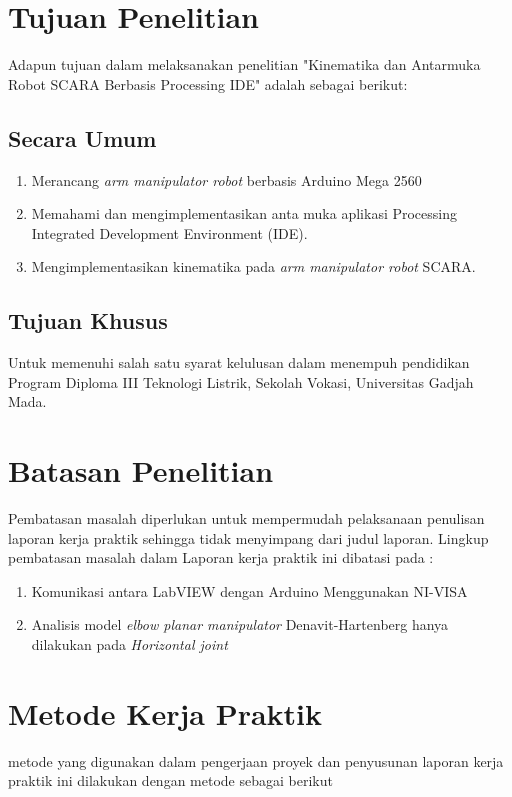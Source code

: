 \section{Tujuan Penelitian}
Adapun tujuan dalam melaksanakan penelitian "Kinematika dan Antarmuka Robot SCARA Berbasis Processing IDE" adalah sebagai berikut:

	\subsection{Secara Umum}
		\begin{enumerate}
		\item Merancang \emph{ arm manipulator robot} berbasis Arduino Mega 2560
		\item Memahami dan mengimplementasikan anta muka aplikasi Processing Integrated Development Environment (IDE).
		\item Mengimplementasikan kinematika pada \emph{arm manipulator robot} SCARA.
	\end{enumerate}
	\subsection{Tujuan Khusus}
	 Untuk memenuhi salah satu syarat kelulusan dalam menempuh pendidikan Program   Diploma III Teknologi Listrik, Sekolah Vokasi, Universitas Gadjah Mada. 
	
	
\section{Batasan Penelitian}
	Pembatasan masalah diperlukan untuk mempermudah pelaksanaan penulisan laporan kerja praktik sehingga tidak menyimpang dari judul laporan. Lingkup pembatasan masalah dalam Laporan kerja praktik ini dibatasi pada :
	
	\begin{enumerate}
		
		\item Komunikasi antara LabVIEW dengan Arduino Menggunakan NI-VISA
		\item Analisis model \textit{elbow planar manipulator} Denavit-Hartenberg hanya dilakukan pada \textit{Horizontal joint}
		
	\end{enumerate}

\section{Metode Kerja Praktik}
metode yang digunakan dalam pengerjaan proyek dan penyusunan laporan kerja praktik ini dilakukan dengan metode sebagai berikut

